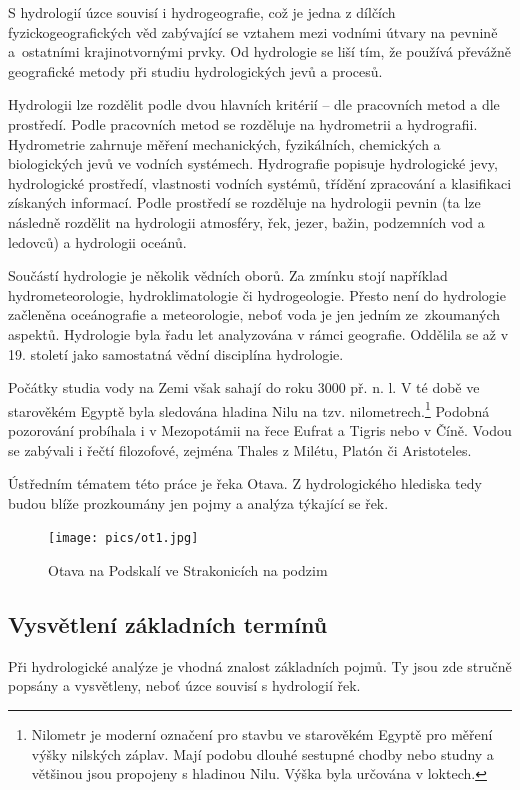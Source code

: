 \documentclass[thesis=M,czech]{FITthesis}[2012/06/26]
\begin{document}
S hydrologií úzce souvisí i hydrogeografie, což je jedna z dílčích fyzickogeografických věd zabývající se vztahem mezi vodními útvary na pevnině a~ostatními krajinotvornými prvky. Od hydrologie se liší tím, že používá převážně geografické metody při studiu hydrologických jevů a procesů. 


Hydrologii lze rozdělit podle dvou hlavních kritérií – dle pracovních metod a dle prostředí. Podle pracovních metod se rozděluje na hydrometrii a hydrografii. Hydrometrie zahrnuje měření mechanických, fyzikálních, chemických a biologických jevů ve vodních systémech. Hydrografie popisuje hydrologické jevy, hydrologické prostředí, vlastnosti vodních systémů, třídění zpracování a klasifikaci získaných informací. Podle prostředí se rozděluje na hydrologii pevnin (ta lze následně rozdělit na hydrologii atmosféry, řek, jezer, bažin, podzemních vod a ledovců) a hydrologii oceánů. 

Součástí hydrologie je několik vědních oborů. Za zmínku stojí například hydrometeorologie, hydroklimatologie či hydrogeologie. Přesto není do hydrologie začleněna oceánografie a meteorologie, neboť voda je jen jedním ze~zkoumaných aspektů. Hydrologie byla řadu let analyzována v rámci geografie. Oddělila se až v 19. století jako samostatná vědní disciplína hydrologie. 

Počátky studia vody na Zemi však sahají do roku 3000 př. n. l. V té době ve starověkém Egyptě byla sledována hladina Nilu na tzv. nilometrech.\footnote{Nilometr je moderní označení pro stavbu ve starověkém Egyptě pro měření výšky nilských záplav. Mají podobu dlouhé sestupné chodby nebo studny a většinou jsou propojeny s hladinou Nilu. Výška byla určována v loktech.} Podobná pozorování probíhala i v Mezopotámii na řece Eufrat a Tigris nebo v Číně. Vodou se zabývali i řečtí filozofové, zejména Thales z Milétu, Platón či Aristoteles. 


Ústředním tématem této práce je řeka Otava. Z hydrologického hlediska tedy budou blíže prozkoumány jen pojmy a analýza týkající se řek. \cite{definiceHydro} \cite{FGkniha} \cite{hydro_net}


\begin{figure}[h!]
	\centering
	\texttt{[image: pics/ot1.jpg]}
	\caption{Otava na Podskalí ve Strakonicích na podzim}
	\label{obrazek:ot1}
\end{figure}


\subsection{Vysvětlení základních termínů}
Při hydrologické analýze je vhodná znalost základních pojmů. Ty jsou zde stručně popsány a vysvětleny, neboť úzce souvisí s hydrologií řek. \cite{terminy}
\end{document}
